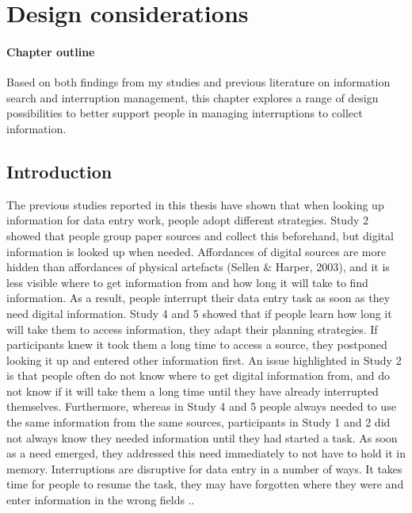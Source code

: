 \chapter{Design considerations}

\begin{mynote}
\subsubsection{Chapter outline}
Based on both findings from my studies and previous literature on information search and interruption management, this chapter explores a range of design possibilities to better support people in managing interruptions to collect information.

\end{mynote}

\section{Introduction}
The previous studies reported in this thesis have shown that when looking up information for data entry work, people adopt different strategies. Study 2 showed that people group paper sources and collect this beforehand, but digital information is looked up when needed. Affordances of digital sources are more hidden than affordances of physical artefacts (Sellen \& Harper, 2003), and it is less visible where to get information from and how long it will take to find information. As a result, people interrupt their data entry task as soon as they need digital information. Study 4 and 5 showed that if people learn how long it will take them to access information, they adapt their planning strategies. If participants knew it took them a long time to access a source, they postponed looking it up and entered other information first. An issue highlighted in Study 2 is that people often do not know where to get digital information from, and do not know if it will take them a long time until they have already interrupted themselves. Furthermore, whereas in Study 4 and 5 people always needed to use the same information from the same sources, participants in Study 1 and 2 did not always know they needed information until they had started a task. As soon as a need emerged, they addressed this need immediately to not have to hold it in memory. Interruptions are disruptive for data entry in a number of ways. It takes time for people to resume the task, they may have forgotten where they were and enter information in the wrong fields \citep{Brumby2013, Monk2008}..

